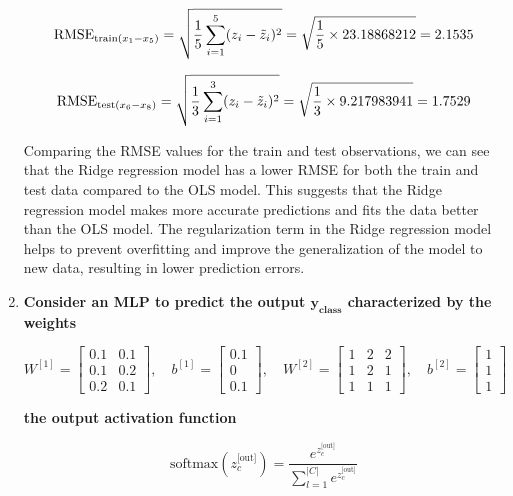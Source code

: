 \documentclass[12pt]{article}
\begin{document}
\begin{enumerate}
    \begin{equation*}
        \text{RMSE}_{\text{train}(x_1\--x_5)} = \sqrt{\frac{1}{5} \sum_{i=1}^{5} (z_{i} - \tilde{z}_{i})^2} = \sqrt{\frac{1}{5} \times 23.18868212} = 2.1535
    \end{equation*}
 
    \begin{equation*}
        \text{RMSE}_{\text{test}(x_6\--x_8)} = \sqrt{\frac{1}{3} \sum_{i=1}^{3} (z_{i} - \tilde{z}_{i})^2} = \sqrt{\frac{1}{3} \times 9.217983941} = 1.7529
    \end{equation*}

    \vspace{20pt}
    Comparing the RMSE values for the train and test observations, we can see that the Ridge regression model has a lower RMSE for both the train and test data compared to the OLS model. This suggests that the Ridge regression model makes more accurate predictions and fits the data better than the OLS model. The regularization term in the Ridge regression model helps to prevent overfitting and improve the generalization of the model to new data, resulting in lower prediction errors.

    \vspace{10pt}
    \item \textbf{Consider an MLP to predict the output $\mathbf{y_\text{class}}$ characterized by the weights}
    
    \[
W^{[1]} = \begin{bmatrix}
0.1 & 0.1 \\
0.1 & 0.2 \\
0.2 & 0.1
\end{bmatrix}, \quad
b^{[1]} = \begin{bmatrix}
0.1 \\
0 \\
0.1
\end{bmatrix}, \quad
W^{[2]} = \begin{bmatrix}
1 & 2 & 2 \\
1 & 2 & 1 \\
1 & 1 & 1
\end{bmatrix}, \quad
b^{[2]} = \begin{bmatrix}
1 \\
1 \\
1
\end{bmatrix}
\]

\textbf{the output activation function}

\begin{equation*}
    \text{softmax}(z_c^\text{[out]}) = \frac{e^{z_c^\text{[out]}}}{\sum_{l=1}^{|C|} e^{z_c^\text{[out]}}}
\end{equation*}


\end{enumerate}
\end{document}
